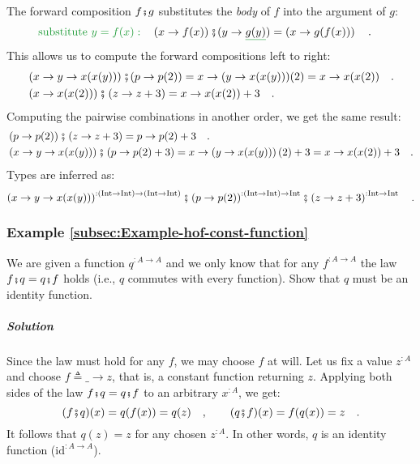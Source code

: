 The forward composition $f\bef g$ substitutes the \emph{body} of
$f$ into the argument of $g$:
\begin{align*}
{\color{greenunder}\text{substitute }y=f(x):}\quad & \left(x\rightarrow f(x)\right)\bef(y\rightarrow\gunderline{g(y)})=\left(x\rightarrow g(f(x))\right)\quad.
\end{align*}
This allows us to compute the forward compositions left to right:
\begin{align*}
 & \left(x\rightarrow y\rightarrow x(x(y))\right)\bef(p\rightarrow p(2))=x\rightarrow(y\rightarrow x(x(y)))(2)=x\rightarrow x(x(2))\quad.\\
 & \left(x\rightarrow x(x(2))\right)\bef\left(z\rightarrow z+3\right)=x\rightarrow x(x(2))+3\quad.
\end{align*}
Computing the pairwise combinations in another order, we get the same
result:
\begin{align*}
 & \left(p\rightarrow p(2)\right)\bef\left(z\rightarrow z+3\right)=p\rightarrow p(2)+3\quad.\\
 & \left(x\rightarrow y\rightarrow x(x(y))\right)\bef\left(p\rightarrow p(2)+3\right)=x\rightarrow\left(y\rightarrow x(x(y))\right)(2)+3=x\rightarrow x(x(2))+3\quad.
\end{align*}
Types are inferred as: 
\[
\left(x\rightarrow y\rightarrow x(x(y))\right)^{:(\text{Int}\rightarrow\text{Int})\rightarrow(\text{Int}\rightarrow\text{Int})}\bef\left(p\rightarrow p(2)\right)^{:(\text{Int}\rightarrow\text{Int})\rightarrow\text{Int}}\bef\left(z\rightarrow z+3\right)^{:\text{Int}\rightarrow\text{Int}}\quad.
\]


\subsubsection{Example \label{subsec:Example-hof-const-function}\ref{subsec:Example-hof-const-function}}

We are given a function $q^{:A\rightarrow A}$ and we only know that
for any $f^{:A\rightarrow A}$ the law $f\bef q=q\bef f$ holds (i.e.,
$q$ commutes with every function). Show that $q$ must be an identity
function.

\subparagraph{Solution}

Since the law must hold for any $f$, we may choose $f$ at will.
Let us fix a value $z^{:A}$ and choose $f\triangleq\_\rightarrow z$,
that is, a constant function returning $z$. Applying both sides of
the law $f\bef q=q\bef f$ to an arbitrary $x^{:A}$, we get:
\[
(f\bef q)(x)=q(f(x))=q(z)\quad,\quad\quad(q\bef f)(x)=f(q(x))=z\quad.
\]
It follows that $q(z)=z$ for any chosen $z^{:A}$. In other words,
$q$ is an identity function ($\text{id}^{:A\rightarrow A}$).

